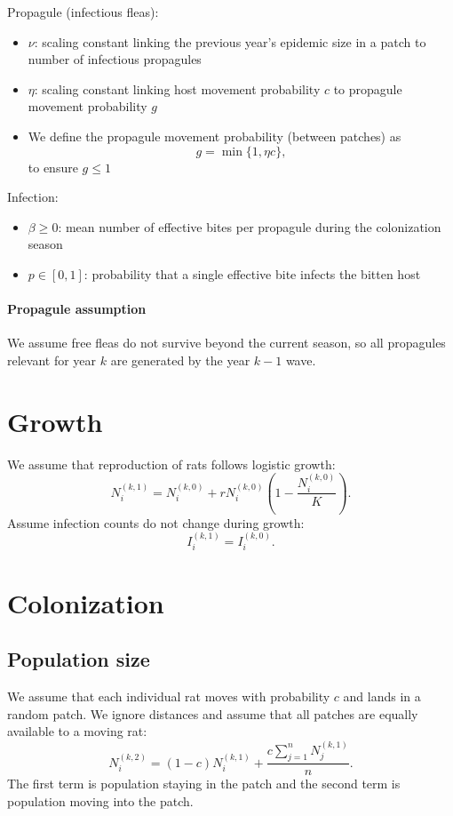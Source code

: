 \documentclass[12pt]{article}
\begin{document}
Propagule (infectious fleas):
\begin{itemize}
\item $\nu$: scaling constant linking the previous year's epidemic size in a patch to number of infectious propagules 
\item $\eta$: scaling constant linking host movement probability $c$ to propagule movement probability $g$ 
\item We define the propagule movement probability (between patches) as
\begin{equation}
g=\min\{1,\eta c\},
\end{equation}
to ensure $g \leq 1$
\end{itemize}

Infection:
\begin{itemize}
\item $\beta \ge 0$: mean number of effective bites per propagule during the colonization season
\item $p\in[0,1]$: probability that a single effective bite infects the bitten host 
\end{itemize}

\paragraph{Propagule assumption}
We assume free fleas do not survive beyond the current season, so all propagules relevant for year $k$ are generated by the year $k-1$ wave.

\section{Growth}
We assume that reproduction of rats follows logistic growth:
\begin{equation}
N_i^{(k,1)}=N_i^{(k,0)}+rN_i^{(k,0)}\left(1-\frac{N_i^{(k,0)}}{K}\right).
\end{equation}
Assume infection counts do not change during growth:
\begin{equation}
I_i^{(k,1)} = I_i^{(k,0)}.
\end{equation}

\section{Colonization}
\subsection{Population size}
We assume that each individual rat moves with probability $c$ and lands in a random patch.
We ignore distances and assume that all patches are equally available to a moving rat:
\begin{equation}
N_i^{(k,2)}=(1-c)N_i^{(k,1)}+\frac{c\sum_{j=1}^n N_j^{(k,1)}}{n}.
\end{equation}
The first term is population staying in the patch and the second term is population moving into the patch.
\end{document}
